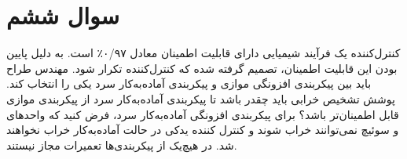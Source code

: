 \section{سوال ششم}

کنترل‌کننده یک فرآیند شیمیایی دارای قابلیت اطمینان معادل ۰/۹۷٪ است. به دلیل پایین بودن این قابلیت اطمینان، تصمیم گرفته شده که کنترل‌کننده تکرار شود. مهندس طراح باید بین پیکربندی افزونگی موازی و پیکربندی آماده‌به‌کار سرد یکی را انتخاب کند. پوشش تشخیص خرابی  باید چقدر باشد تا پیکربندی آماده‌به‌کار سرد از پیکربندی موازی قابل اطمینان‌تر باشد؟ برای پیکربندی افزونگی آماده‌به‌کار سرد، فرض کنید که واحدهای  و سوئیچ نمی‌توانند خراب شوند و کنترل کننده یدکی در حالت آماده‌به‌کار خراب نخواهند شد. در هیچ‌یک از پیکربندی‌ها تعمیرات مجاز نیستند.




\begin{qsolve}
	
\end{qsolve}